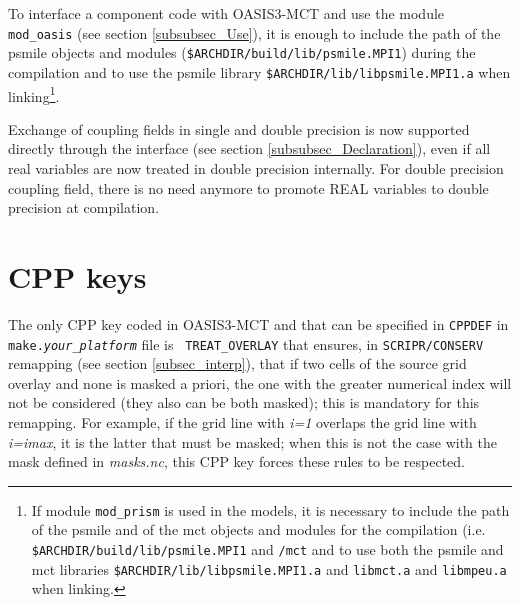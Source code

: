 To interface  a component code with OASIS3-MCT and use the module {\tt mod\_oasis} (see section \ref{subsubsec_Use}), it is enough to include the path of the psmile objects and
modules ({\tt \$ARCHDIR/build/lib/psmile.MPI1}) during the compilation and to use the psmile library {\tt \$ARCHDIR/lib/libpsmile.MPI1.a} when
linking\footnote{If module {\tt mod\_prism} is used in the models, it is necessary to
include the path of the psmile and of the mct objects and modules for
the compilation (i.e. {\tt \$ARCHDIR/build/lib/psmile.MPI1} and {\tt /mct} and to use both the psmile and mct libraries {\tt \$ARCHDIR/lib/libpsmile.MPI1.a} and {\tt libmct.a} and {\tt libmpeu.a} when linking.}.

Exchange of coupling fields in single and double precision is now supported directly through the interface 
(see section \ref{subsubsec_Declaration}), even if all real variables are now treated in double precision internally.
For double precision coupling field, there is no need anymore to promote REAL variables to double precision at compilation.

\section{CPP keys}
\label{subsec_cpp}

The only CPP key coded in OASIS3-MCT and that can be specified in
{\tt CPPDEF} in {\tt make.{\it your\_platform}} file is {\tt
  TREAT\_OVERLAY} that ensures, in {\tt SCRIPR/CONSERV}
  remapping (see section \ref{subsec_interp}), that if two cells of
  the source grid overlay and none is masked a priori, the one with the greater numerical
  index will not be considered (they also can be both masked); this is mandatory
  for this remapping. For example, if the grid line with {\it i=1} overlaps
  the grid line with {\it i=imax}, it is the latter that must be masked;
  when this is not the case with the mask defined in {\it masks.nc},
  this CPP key forces these rules to be respected.


